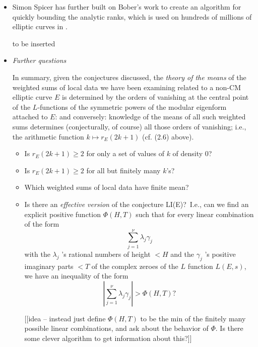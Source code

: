 \documentclass[11pt]{article}
\theoremstyle{plain}
\theoremstyle{definition}
\numberwithin{equation}{section}
\numberwithin{figure}{section}
\numberwithin{table}{section}
\begin{document}
\begin{itemize}
\item Simon Spicer has further built on
Bober's work to create an algorithm for quickly bounding the analytic
ranks, which is used on hundreds of millions of elliptic
curves in \cite[\S 2.3]{ecdb:height}.

\centerline{to be inserted}
\vskip10pt
\item {\it Further questions}

 In summary, given the conjectures discussed, the {\it theory of the means} of the  weighted sums of local data we have been examining related to a non-CM elliptic curve $E$ is determined by the orders of vanishing at the central point of the $L$-functions of the symmetric powers of the modular eigenform attached to $E$: and conversely: knowledge of the means of all such weighted sums determines (conjecturally, of course) all those orders of vanishing; i.e., the arithmetic function  $k \mapsto r_E(2k+1)$ (cf. (2.6) above).
\begin{itemize}\item
Is $r_E(2k+1)\ge 2$ for  only a set of values of $k$ of density $0$?
 \item  Is  $r_E(2k+1)\ge 2$ for all but finitely many $k$'s?  \item Which weighted sums of local data have finite mean?
\item  Is there an  {\it effective version}  of  the conjecture LI(E)?\  I.e., can we find  an explicit  positive function $\Phi(H,T)$ such that for every linear combination of the form $$\sum_{j=1}^{\nu} \lambda_j\gamma_j$$ with the $\lambda_j$ 's rational numbers of height $< H$ and the  $\gamma_j$ 's  positive imaginary parts $<T$ of the complex zeroes of the $L$ function $L(E,s)$, we have  an inequality of the form $$\left|\sum_{j=1}^{\nu} \lambda_j\gamma_j\right|  > \Phi(H, T)?$$

[[idea -- instead just define $\Phi(H,T)$ to be the min
of the finitely many possible linear combinations, and ask
about the behavior of $\Phi$.  Is there some clever algorithm
to get information about this?]]
\end{itemize}\end{itemize}
\end{document}
